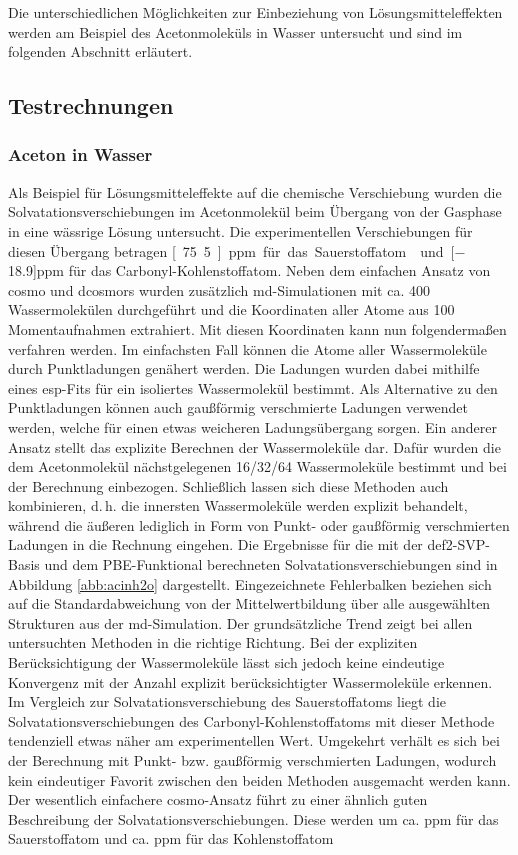Die unterschiedlichen Möglichkeiten zur Einbeziehung von Lösungsmitteleffekten werden am Beispiel des Acetonmoleküls in Wasser untersucht und sind im folgenden Abschnitt erläutert.
	
	\subsection{Testrechnungen}\label{lömitest}
	\subsubsection{Aceton in Wasser}
	Als Beispiel für Lösungsmitteleffekte auf die chemische Verschiebung wurden die Solvatationsverschiebungen im Acetonmolekül beim Übergang von der Gasphase in eine wässrige Lösung untersucht. Die experimentellen Verschiebungen für diesen Übergang betragen \unit[75.5]{ppm} für das Sauerstoffatom\supercite{cossi2003different} und \unit[$-$18.9]{ppm} für das Carbonyl-Kohlenstoffatom\supercite{tiffon1978effet}. Neben dem einfachen Ansatz von \ac{cosmo} und \ac{dcosmors} wurden zusätzlich \ac{md}-Simulationen mit ca. 400 Wassermolekülen durchgeführt und die Koordinaten aller Atome aus 100 Momentaufnahmen extrahiert. Mit diesen Koordinaten kann nun folgendermaßen verfahren werden. Im einfachsten Fall können die Atome aller Wassermoleküle durch Punktladungen genähert werden. Die Ladungen wurden dabei mithilfe eines \acs{esp}-Fits für ein isoliertes Wassermolekül bestimmt. Als Alternative zu den Punktladungen können auch gaußförmig verschmierte Ladungen verwendet werden, welche für einen etwas weicheren Ladungsübergang sorgen. Ein anderer Ansatz stellt das explizite Berechnen der Wassermoleküle dar. Dafür wurden die dem Acetonmolekül nächstgelegenen 16/32/64 Wassermoleküle bestimmt und bei der Berechnung einbezogen. Schließlich lassen sich diese Methoden auch kombinieren, d.\,h. die innersten Wassermoleküle werden explizit behandelt, während die äußeren lediglich in Form von Punkt- oder gaußförmig verschmierten Ladungen in die Rechnung eingehen. Die Ergebnisse für die mit der def2-SVP-Basis\supercite{weigend2005balanced} und dem PBE-Funktional\supercite{perdew1996generalized} berechneten Solvatationsverschiebungen sind in Abbildung \ref{abb:acinh2o} dargestellt. Eingezeichnete Fehlerbalken beziehen sich auf die Standardabweichung von der Mittelwertbildung über alle ausgewählten Strukturen aus der \ac{md}-Simulation. Der grundsätzliche Trend zeigt bei allen untersuchten Methoden in die richtige Richtung. Bei der expliziten Berücksichtigung der Wassermoleküle lässt sich jedoch keine eindeutige Konvergenz mit der Anzahl explizit berücksichtigter Wassermoleküle erkennen. Im Vergleich zur Solvatationsverschiebung des Sauerstoffatoms liegt die Solvatationsverschiebungen des Carbonyl-Kohlenstoffatoms mit dieser Methode tendenziell etwas näher am experimentellen Wert. Umgekehrt verhält es sich bei der Berechnung mit Punkt- bzw. gaußförmig verschmierten Ladungen, wodurch kein eindeutiger Favorit zwischen den beiden Methoden ausgemacht werden kann. Der wesentlich einfachere \ac{cosmo}-Ansatz führt zu einer ähnlich guten Beschreibung der Solvatationsverschiebungen. Diese werden um ca. \unit[25]{ppm} für das Sauerstoffatom und ca. \unit[9]{ppm} für das Kohlenstoffatom 